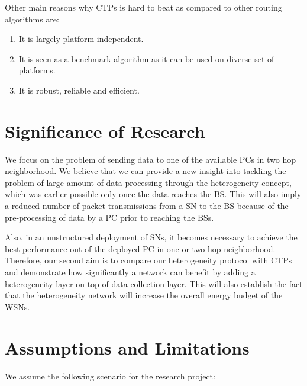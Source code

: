     Other main reasons why \acp{CTP} is hard to beat as compared to other routing algorithms 
    are:
    
    \begin{enumerate}
        \item It is largely platform independent.
        \item It is seen as a benchmark algorithm as it can be used on diverse set of platforms.
        \item It is robust, reliable and efficient.
    \end{enumerate}

\section{Significance of Research}

We focus on the problem of sending data to one of the available \acp{PC} in two hop neighborhood. We believe that we can provide a new insight  into tackling the problem of large amount of data processing through the heterogeneity concept, which was earlier possible only once the data reaches the \ac{BS}. This will also imply a reduced number of packet transmissions from a \ac{SN} to the \ac{BS} because of the pre-processing of data by a \ac{PC} prior to reaching the \acp{BS}.
\par

Also, in an unstructured deployment of \acp{SN}, it becomes necessary to achieve the best performance out of the deployed \ac{PC} in one or two hop neighborhood. Therefore, our second aim is to compare our heterogeneity protocol with \acp{CTP} and demonstrate how significantly a network can benefit by adding a heterogeneity layer on top of data collection layer. This will also establish the fact that the heterogeneity network will increase the overall energy budget of the \acp{WSN}.

\section{Assumptions and Limitations}
We assume the following scenario for the research project:

